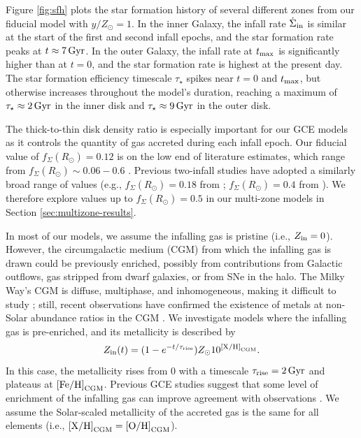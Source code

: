 \documentclass[twocolumn,twocolappendix,linenumbers]{aastex631}
\newcommand{\mathXH}{{\rm [X/H]}}
\newcommand{\mathOH}{{\rm [O/H]}}
\newcommand{\mathFeH}{{\rm [Fe/H]}}
\newcommand{\mathOFe}{{\rm [O/Fe]}}
\begin{document}
Figure \ref{fig:sfh} plots the star formation history of several different zones from our fiducial model with $y/Z_\odot=1$. In the inner Galaxy, the infall rate $\dot\Sigma_{\rm in}$ is similar at the start of the first and second infall epochs, and the star formation rate peaks at $t\approx7\,{\rm Gyr}$. In the outer Galaxy, the infall rate at $t_{\rm max}$ is significantly higher than at $t=0$, and the star formation rate is highest at the present day. The star formation efficiency timescale $\tau_\star$ spikes near $t=0$ and $t_{\rm max}$, but otherwise increases throughout the model's duration, reaching a maximum of $\tau_\star\approx2\,{\rm Gyr}$ in the inner disk and $\tau_\star\approx 9\,{\rm Gyr}$ in the outer disk.

The thick-to-thin disk density ratio is especially important for our GCE models as it controls the quantity of gas accreted during each infall epoch. Our fiducial value of $f_\Sigma(R_\odot)=0.12$ is on the low end of literature estimates, which range from $f_\Sigma(R_\odot)\sim0.06-0.6$ \citep[e.g.,][]{gilmore_new_1983,siegel_star_2002,juric_milky_2008,mackereth_age-metallicity_2017,fuhrmann_local_2017}. Previous two-infall studies have adopted a similarly broad range of values (e.g., $f_\Sigma(R_\odot)=0.18$ from \citealt{spitoni_apogee_2021}; $f_\Sigma(R_\odot)=0.4$ from \citealt{spitoni_remind_2024}). We therefore explore values up to $f_\Sigma(R_\odot)=0.5$ in our multi-zone models in Section \ref{sec:multizone-results}.

In most of our models, we assume the infalling gas is pristine (i.e., $Z_{\rm in}=0$). However, the circumgalactic medium (CGM) from which the infalling gas is drawn could be previously enriched, possibly from contributions from Galactic outflows, gas stripped from dwarf galaxies, or from SNe in the halo. The Milky Way's CGM is diffuse, multiphase, and inhomogeneous, making it difficult to study \citep[e.g.,][]{tumlinson_circumgalactic_2017,mathur_probing_2022}; still, recent observations have confirmed the existence of metals at non-Solar abundance ratios in the CGM \citep[e.g.,][]{das_discovery_2019,das_hot_2021,gupta_supervirial_2021}. We investigate models where the infalling gas is pre-enriched, and its metallicity is described by
\begin{equation}
    \label{eq:pre-enrichment}
    Z_{\rm in}(t) = (1 - e^{-t/\tau_{\rm rise}}) Z_\odot 10^{\mathXH_{\rm CGM}}.
\end{equation}
In this case, the metallicity rises from 0 with a timescale $\tau_{\rm rise}=2\,{\rm Gyr}$ and plateaus at $\mathFeH_{\rm CGM}$. Previous GCE studies suggest that some level of enrichment of the infalling gas can improve agreement with observations \citep[e.g.,][]{palla_chemical_2020,johnson_milky_2024,spitoni_remind_2024}. We assume the Solar-scaled metallicity of the accreted gas is the same for all elements (i.e., $\mathXH_{\rm CGM}=\mathOH_{\rm CGM}$).
\end{document}
